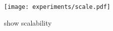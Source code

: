 \begin{figure}
    \centering
    \texttt{[image: experiments/scale.pdf]}
    \caption{show scalability}
    \label{fig:scalability}
\end{figure}

